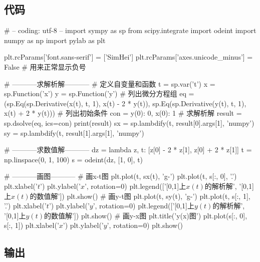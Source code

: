 \subsection{代码}
\begin{python}
# -- coding: utf-8 --
import sympy as sp
from scipy.integrate import odeint
import numpy as np
import pylab as plt

plt.rcParams['font.sans-serif'] = ['SimHei']
plt.rcParams['axes.unicode_minus'] = False  # 用来正常显示负号

# -----------求解析解-----------
# 定义自变量和函数
t = sp.var('t')
x = sp.Function('x')
y = sp.Function('y')
# 列出微分方程组
eq = (sp.Eq(sp.Derivative(x(t), t, 1), x(t) - 2 * y(t)), sp.Eq(sp.Derivative(y(t), t, 1), x(t) + 2 * y(t)))
# 列出初始条件
con = {y(0): 0, x(0): 1}
# 求解析解
result = sp.dsolve(eq, ics=con)
print(result)
sx = sp.lambdify(t, result[0].args[1], 'numpy')
sy = sp.lambdify(t, result[1].args[1], 'numpy')

# -----------求数值解-----------
dz = lambda z, t: [z[0] - 2 * z[1], z[0] + 2 * z[1]]
t = np.linspace(0, 1, 100)
s = odeint(dz, [1, 0], t)

# -----------画图-----------
# 画x-t图
plt.plot(t, sx(t), 'g-')
plt.plot(t, s[:, 0], '.')
plt.xlabel('$t$')
plt.ylabel('$x$', rotation=0)
plt.legend(['[0,1]上$x(t)$的解析解', '[0,1]上$x(t)$的数值解'])
plt.show()
# 画y-t图
plt.plot(t, sy(t), 'g-')
plt.plot(t, s[:, 1], '.')
plt.xlabel('$t$')
plt.ylabel('$y$', rotation=0)
plt.legend(['[0,1]上$y(t)$的解析解', '[0,1]上$y(t)$的数值解'])
plt.show()
# 画y-x图
plt.title('y(x)图')
plt.plot(s[:, 0], s[:, 1])
plt.xlabel('$x$')
plt.ylabel('$y$', rotation=0)
plt.show()

\end{python}

\subsection{输出}
\begin{python}
\end{python}
